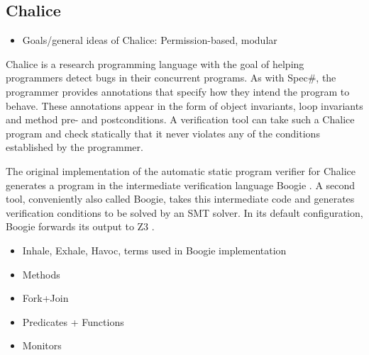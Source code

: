 
\subsection{Chalice}

\begin{sketch}
\begin{itemize}
\item Goals/general ideas of Chalice: Permission-based, modular
\end{itemize}
\end{sketch}

Chalice is a research programming language with the goal of helping programmers detect bugs in their concurrent programs. As with Spec\#, the programmer provides annotations that specify how they intend the program to behave.
These annotations appear in the form of object invariants, loop invariants and method pre- and postconditions.
A verification tool can take such a Chalice program and check statically that it never violates any of the conditions established by the programmer.

The original implementation of the automatic static program verifier for Chalice generates a program in the intermediate verification language Boogie \cite{ByECD+06}.
A second tool, conveniently also called Boogie, takes this intermediate code and generates verification conditions to be solved by an SMT solver.
In its default configuration, Boogie forwards its output to Z3 \cite{dMB08}.


\begin{sketch}
\begin{itemize}
\item Inhale, Exhale, Havoc, terms used in Boogie implementation
\end{itemize}
\end{sketch}
\begin{sketch}
\begin{itemize}
\item Methods
\end{itemize}
\end{sketch}
\begin{sketch}
\begin{itemize}
\item Fork+Join
\end{itemize}
\end{sketch}
\begin{sketch}
\begin{itemize}
\item Predicates + Functions
\end{itemize}
\end{sketch}
\begin{sketch}
\begin{itemize}
\item Monitors
\end{itemize}
\end{sketch}